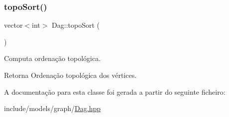 \subsubsection{\texorpdfstring{topo\+Sort()}{topoSort()}}
{\footnotesize\ttfamily vector$<$int$>$ Dag\+::topo\+Sort (\begin{DoxyParamCaption}{ }\end{DoxyParamCaption})}

Computa ordenação topológica. \begin{DoxyReturn}{Retorna}
Ordenação topológica dos vértices. 
\end{DoxyReturn}


A documentação para esta classe foi gerada a partir do seguinte ficheiro\+:\begin{DoxyCompactItemize}
\item 
include/models/graph/\hyperlink{Dag_8hpp}{Dag.\+hpp}\end{DoxyCompactItemize}
